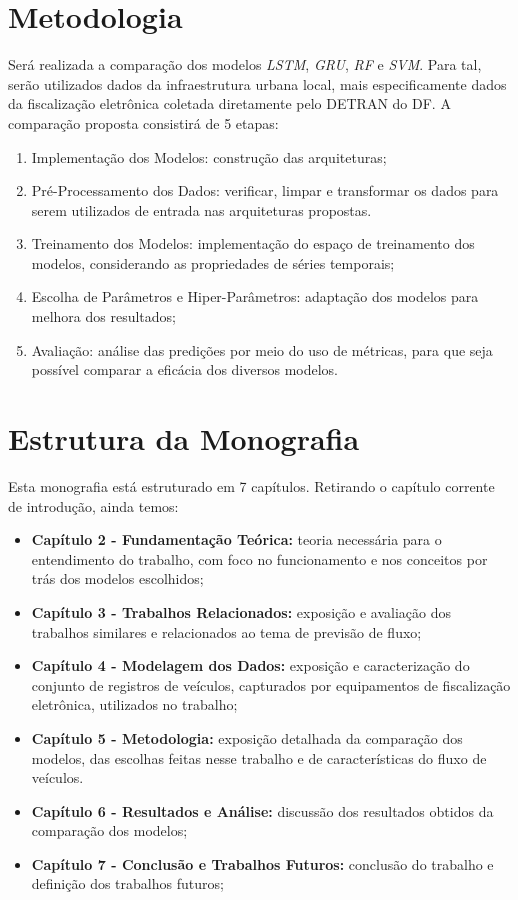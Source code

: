 \section{Metodologia}

Será realizada a comparação dos modelos  \textit{\acrshort{LSTM}}, \textit{\acrshort{GRU}}, \textit{\acrshort{RF}} e \textit{\acrshort{SVM}}. Para tal, serão utilizados dados da infraestrutura urbana local, mais especificamente dados da fiscalização eletrônica coletada diretamente pelo \acrfull{DETRAN} do \acrfull{DF}. A comparação proposta consistirá de 5 etapas:

\begin{enumerate}
    \item Implementação dos Modelos: construção das arquiteturas;
    \item Pré-Processamento dos Dados: verificar, limpar e transformar os dados para serem utilizados de entrada nas arquiteturas propostas.
    \item Treinamento dos Modelos: implementação do espaço de treinamento dos modelos, considerando as propriedades de séries temporais;
    \item Escolha de Parâmetros e Hiper-Parâmetros: adaptação dos modelos para melhora dos resultados;
    \item Avaliação: análise das predições por meio do uso de métricas, para que seja possível comparar a eficácia dos diversos modelos.
\end{enumerate}

\section{Estrutura da Monografia}

Esta monografia está estruturado em 7 capítulos. Retirando o capítulo corrente de introdução, ainda temos:

\begin{itemize}
    \item \textbf{Capítulo 2 - Fundamentação Teórica:} teoria necessária para o entendimento do trabalho, com foco no funcionamento e nos conceitos por trás dos modelos escolhidos;
    \item \textbf{Capítulo 3 - Trabalhos Relacionados:} exposição e avaliação dos trabalhos similares e relacionados ao tema de previsão de fluxo;
    \item \textbf{Capítulo 4 - Modelagem dos Dados:} exposição e caracterização do conjunto de registros de veículos, capturados por equipamentos de fiscalização eletrônica, utilizados no trabalho;
    \item \textbf{Capítulo 5 - Metodologia:} exposição detalhada da comparação dos modelos, das escolhas feitas nesse trabalho e de características do fluxo de veículos.
    \item \textbf{Capítulo 6 - Resultados e Análise:} discussão dos resultados obtidos da comparação dos modelos;
    \item \textbf{Capítulo 7 - Conclusão e Trabalhos Futuros:} conclusão do trabalho e definição dos trabalhos futuros;
\end{itemize}
